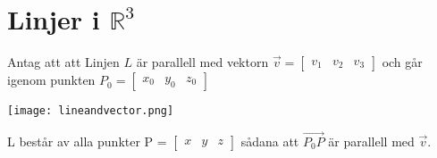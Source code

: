 \section{Linjer i $\mathbb{R}^3$} %
\label{sec:linjer_i_}
Antag att att Linjen $L$ är parallell med vektorn $\vec{v} = \begin{bmatrix} v_1&v_2&v_3 \end{bmatrix}$ och går igenom punkten $P_0 = \begin{bmatrix} x_0&y_0&z_0 \end{bmatrix}$
\begin{center}
    \texttt{[image: lineandvector.png]}
\end{center}
L består av alla punkter P = $\begin{bmatrix} x&y&z \end{bmatrix}$ sådana att $\overrightarrow{P_0P}$ är parallell med $\vec{v}$. \\

